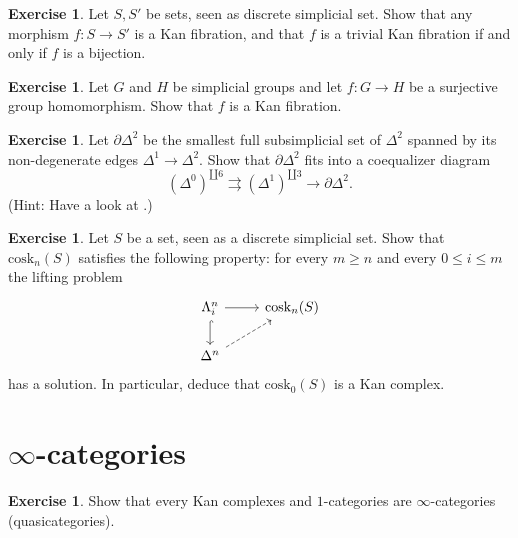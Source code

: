\documentclass[10pt,a4paper,reqno,oneside]{book} %
\theoremstyle{plain}
\theoremstyle{definition}
\newtheorem{exercise}[thm]{Exercise}
\theoremstyle{remark}
\numberwithin{equation}{section}
\begin{document}
\begin{exercise}
	Let $S, S'$ be sets, seen as discrete simplicial set.
	Show that any morphism $f \colon S \to S'$ is a Kan fibration, and that $f$ is a trivial Kan fibration if and only if $f$ is a bijection.
\end{exercise}

\begin{exercise}
	Let $G$ and $H$ be simplicial groups and let $f \colon G \to H$ be a surjective group homomorphism.
	Show that $f$ is a Kan fibration.
\end{exercise}

\begin{exercise}
	Let $\partial \Delta^2$ be the smallest full subsimplicial set of $\Delta^2$ spanned by its non-degenerate edges $\Delta^1 \to \Delta^2$.
	Show that $\partial \Delta^2$ fits into a coequalizer diagram
	\[ (\Delta^0)^{\amalg 6} \rightrightarrows (\Delta^1)^{\amalg 3} \to \partial \Delta^2 . \]
	(Hint: Have a look at \cite[Theorem III.3.1]{Gabriel_Zisman_Calculus_of_fractions}.)
\end{exercise}

\begin{exercise} \label{ex:coskeleton_Kan_complex}
	Let $S$ be a set, seen as a discrete simplicial set.
	Show that $\mathrm{cosk}_n(S)$ satisfies the following property: for every $m \ge n$ and every $0 \le i \le m$ the lifting problem
	\[ \begin{tikzcd}
		\Lambda^n_i \arrow{r} \arrow[hook]{d} & \mathrm{cosk}_n(S) \\
		\Delta^n \arrow[dashed]{ur}
	\end{tikzcd} \]
	has a solution.
	In particular, deduce that $\mathrm{cosk}_0(S)$ is a Kan complex.
\end{exercise}

\section{$\infty$-categories}

\begin{exercise}
	Show that every Kan complexes and $1$-categories are $\infty$-categories (quasicategories).
\end{exercise}
\end{document}
